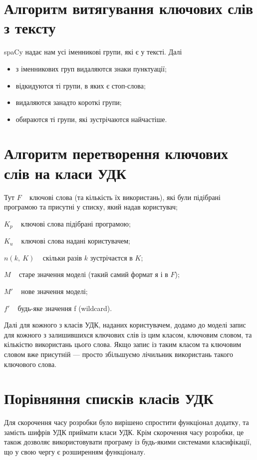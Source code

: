 \documentclass{article}
\let\oldsection\section
\renewcommand{\section}{\clearpage\oldsection}
\begin{document}
\section{Алгоритм витягування ключових слів з тексту}
	spaCy надає нам усі іменникові групи, які є у тексті. Далі
\begin{itemize}
  \item з іменникових груп видаляются знаки пунктуації;
  \item відкидуются ті групи, в яких є стоп-слова;
  \item видаляются занадто короткі групи;
  \item обираются ті групи, які зустрічаются найчастіше.
\end{itemize}


\section{Алгоритм перетворення ключових слів на класи УДК}

Тут $F$ \textemdash~ ключові слова (та кількість їх використань),
      які були підібрані програмою та присутні у списку, який надав користувач;

  $K_p$ \textemdash~ ключові слова підібрані програмою;

  $K_u$ \textemdash~ ключові слова надані користувачем;

  $n(k,~ K)$ \textemdash~ скільки разів $k$ зустрічаєтся в $K$;

  $M$ \textemdash~ старе значення моделі (такий самий формат я і в $F$);

  $M'$ \textemdash~ нове значення моделі;

  $f'$ \textemdash~ будь-яке значення f (wildcard).

  Далі для кожного з класів УДК, наданих користувачем,
  додамо до моделі запис для кожного з залишившихся ключових слів із цим класом,
  ключовим словом, та кількістю використань цього слова.
  Якщо запис із таким класом та ключовим словом вже присутній ---
  просто збільшуємо лічильник використань такого ключового слова.

\section{Порівняння списків класів УДК}
Для скорочення часу розробки було вирішено спростити функціонал додатку,
  та замість шифрів УДК приймати класи УДК.
  Крім скорочення часу розробки, це також дозволяє використовувати програму
  із будь-якими системами класифікації,
  що у свою чергу є розширенням функціоналу.
\end{document}
